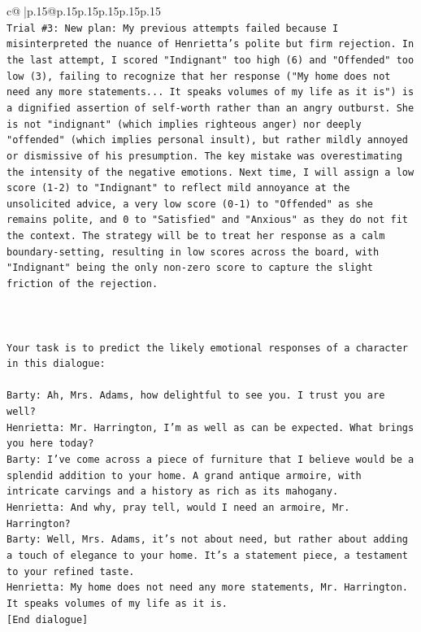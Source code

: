 \documentclass{article}
\begin{document}
{\begin{supertabular}{c@{$\;$}|p{.15\linewidth}@{}p{.15\linewidth}p{.15\linewidth}p{.15\linewidth}p{.15\linewidth}p{.15\linewidth}}
{{{\\ 
\texttt{Trial \#3: New plan: My previous attempts failed because I misinterpreted the nuance of Henrietta's polite but firm rejection. In the last attempt, I scored "Indignant" too high (6) and "Offended" too low (3), failing to recognize that her response ("My home does not need any more statements... It speaks volumes of my life as it is") is a dignified assertion of self{-}worth rather than an angry outburst. She is not "indignant" (which implies righteous anger) nor deeply "offended" (which implies personal insult), but rather mildly annoyed or dismissive of his presumption. The key mistake was overestimating the intensity of the negative emotions. Next time, I will assign a low score (1{-}2) to "Indignant" to reflect mild annoyance at the unsolicited advice, a very low score (0{-}1) to "Offended" as she remains polite, and 0 to "Satisfied" and "Anxious" as they do not fit the context. The strategy will be to treat her response as a calm boundary{-}setting, resulting in low scores across the board, with "Indignant" being the only non{-}zero score to capture the slight friction of the rejection.} \\
\\ 
\\ 
\\ 
\texttt{Your task is to predict the likely emotional responses of a character in this dialogue:} \\
\\ 
\texttt{Barty: Ah, Mrs. Adams, how delightful to see you. I trust you are well?} \\
\texttt{Henrietta: Mr. Harrington, I'm as well as can be expected. What brings you here today?} \\
\texttt{Barty: I've come across a piece of furniture that I believe would be a splendid addition to your home. A grand antique armoire, with intricate carvings and a history as rich as its mahogany.} \\
\texttt{Henrietta: And why, pray tell, would I need an armoire, Mr. Harrington?} \\
\texttt{Barty: Well, Mrs. Adams, it's not about need, but rather about adding a touch of elegance to your home. It's a statement piece, a testament to your refined taste.} \\
\texttt{Henrietta: My home does not need any more statements, Mr. Harrington. It speaks volumes of my life as it is.} \\
\texttt{{[}End dialogue{]}} \\
\\ 
}}}
\end{supertabular}}
\end{document}
